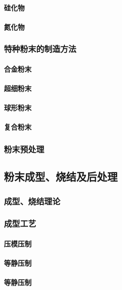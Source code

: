 \documentclass[UTF8]{../../ApplicationUniverse}
\begin{document}
            \paragraph{硅化物}
            \paragraph{氮化物}
        \subsubsection{特种粉末的制造方法}
            \paragraph{合金粉末}
            \paragraph{超细粉末}
            \paragraph{球形粉末}
            \paragraph{复合粉末}
        \subsubsection{粉末预处理}
    \subsection{粉末成型、烧结及后处理}
        \subsubsection{成型、烧结理论}
        \subsubsection{成型工艺}
            \paragraph{压模压制}
            \paragraph{等静压制}
            \paragraph{等静压制}
\end{document}
